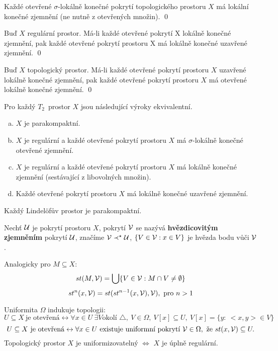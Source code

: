 \documentclass[12pt,a4paper]{article}
\newcommand{\head}[1]{\medskip\noindent {\bf #1}}
\newcommand\Hausd{$T_2$\xspace}
\begin{document}
\lemma[1] Každé otevřené $\sigma$-lokálně konečné pokrytí topologického
	prostoru $X$ má lokální konečné zjemnění (ne nutně z otevřených množin).
\dukaz \qed

\lemma[2] Buď $X$ regulární prostor. Má-li každé otevřené pokrytí X lokálně
	konečné zjemnění, pak každé otevřené pokrytí prostoru X má lokálně konečné
	uzavřené zjemnění.
\dukaz \qed

\lemma[3] Buď $X$ topologický prostor. Má-li každé otevřené pokrytí prostoru
	$X$ uzavřené lokálně konečné zjemnění, pak každé otevřené pokrytí prostoru
	$X$ má otevřené lokálně konečné zjemnění.
\dukaz \qed

\begin{veta}
Pro každý \Hausd~prostor $X$ jsou následující výroky ekvivalentní.
	\begin{enumerate}[(a)]
		\item $X$ je parakompaktní.
		\item $X$ je regulární a každé otevřené pokrytí prostoru $X$ má
			$\sigma$-lokálně konečné otevřené zjemnění.
		\item $X$ je regulární a každé otevřené pokrytí prostoru $X$ má lokálně
			konečné zjemnění (sestávající z libovolných množin).
		\item Každé otevřené pokrytí prostoru $X$ má lokálně konečné uzavřené
			zjemnění.
	\end{enumerate}
\end{veta}

\head {Důsledek:} Každý Lindelöfův prostor je parakompaktní.

 Nechť $\mathcal{ U }$ je pokrytí prostoru $X$, pokrytí $\mathcal{ V }$ se nazývá {\bf
	hvězdicovitým zjemněním} pokrytí $\mathcal{ U }$, značíme $\mathcal{ V } \prec^\star \mathcal{ U }$,
	$\{ V \in \mathcal{ V } : x \in V\}$ je hvězda bodu vůči $\mathcal{ V }$.

	Analogicky pro $M \subseteq X$:
		$$st(M, \mathcal{ V }) = \bigcup \{ V \in \mathcal{ V } : M \cap V \neq \emptyset \}$$
		$$st^n(x, \mathcal{ V }) = st(st^{n-1}(x, \mathcal{ V }), \mathcal{ V }),~\text{pro } n > 1$$

\head {Poznámka:} Uniformita $\Omega$ indukuje topologii:
	$$U \subseteq X~\text{je otevřená} \leftrightarrow \forall x \in U~\exists V \text{okolí } \triangle,~V \in \Omega,~V[x] \subseteq U,~V[x] = \{ y :~<x,y> \in V\}$$
	$$U \subseteq X~\text{je otevřená} \leftrightarrow \forall x \in U~\text{existuje uniformní pokrytí } \mathcal{ V } \in \Omega,\text{ že } st(x, \mathcal{ V }) \subseteq U.$$
	Topologický prostor $X$ je uniformizovatelný $\iff$ $X$ je úplně regulární.
\end{document}
